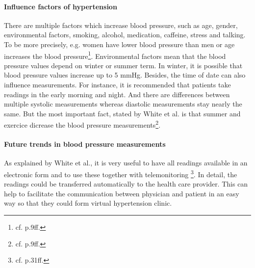 \paragraph{Influence factors of hypertension}
There are multiple factors which increase blood pressure, such as age, gender, environmental factors, smoking, alcohol, medication, caffeine, stress and talking.
To be more precisely, e.g. women have lower blood pressure than men or age increases the blood pressure\footnote{cf. p.9ff.\autocite{white_blood_2007}}. Environmental factors mean that the blood pressure values depend on winter or summer term. In winter, it is possible that blood pressure values increase up to 5 mmHg. Besides, the time of date can also influence measurements. For instance, it is recommended that patients take readings in the early morning and night. And there are differences between multiple systolic measurements whereas diastolic measurements stay nearly the same. But the most important fact, stated by White et al. is that summer and exercice dicrease the blood pressure measurements\footnote{cf. p.9ff.\autocite{white_blood_2007}}.

\paragraph{Future trends in blood pressure measurements}
As explained by White et al., it is very useful to have all readings available in an electronic form and to use these together with telemonitoring \footnote{cf. p.31ff.\autocite{white_blood_2007}}. In detail, the readings could be transferred automatically to the health care provider. This can help to facilitate the communication between physician and patient in an easy way so that they could form virtual hypertension clinic.

